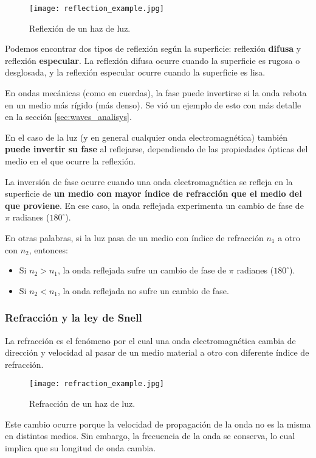 \begin{wrapfigure}{l}{0.3\textwidth}
  \centering
  \texttt{[image: reflection\_example.jpg]}
  \caption{Reflexión de un haz de luz.}
  \label{fig:reflexion}
\end{wrapfigure}
Podemos encontrar dos tipos de reflexión según la superficie: reflexión \textbf{difusa} y reflexión \textbf{especular}. La reflexión difusa ocurre cuando la superficie es rugosa o desglosada, y la reflexión especular ocurre cuando la superficie es lisa.

En ondas mecánicas (como en cuerdas), la fase puede invertirse si la onda rebota en un medio más rígido (más denso). Se vió un ejemplo de esto con más detalle en la sección \ref{sec:waves_analisys}. 

En el caso de la luz (y en general cualquier onda electromagnética) también \textbf{puede invertir su fase} al reflejarse, dependiendo de las propiedades ópticas del medio en el que ocurre la reflexión.

La inversión de fase ocurre cuando una onda electromagnética se refleja en la superficie de \textbf{un medio con mayor índice de refracción que el medio del que proviene}. En ese caso, la onda reflejada experimenta un cambio de fase de \(\pi\) radianes (\(180^\circ\)).

En otras palabras, si la luz pasa de un medio con índice de refracción \(n_1\) a otro con \(n_2\), entonces:
\begin{itemize}
  \item Si \(n_2 > n_1\), la onda reflejada sufre un cambio de fase de \(\pi\) radianes (\(180^\circ\)).
  \item Si \(n_2 < n_1\), la onda reflejada no sufre un cambio de fase.
\end{itemize}

\subsubsection{Refracción y la ley de Snell}

La refracción es el fenómeno por el cual una onda electromagnética cambia de dirección y velocidad al pasar de un medio material a otro con diferente índice de refracción.

\begin{wrapfigure}{r}{0.3\textwidth}
  \centering
  \texttt{[image: refraction\_example.jpg]}
  \caption{Refracción de un haz de luz.}
  \label{fig:refraction}
\end{wrapfigure}
Este cambio ocurre porque la velocidad de propagación de la onda no es la misma en distintos medios. Sin embargo, la frecuencia de la onda se conserva, lo cual implica que su longitud de onda cambia.

